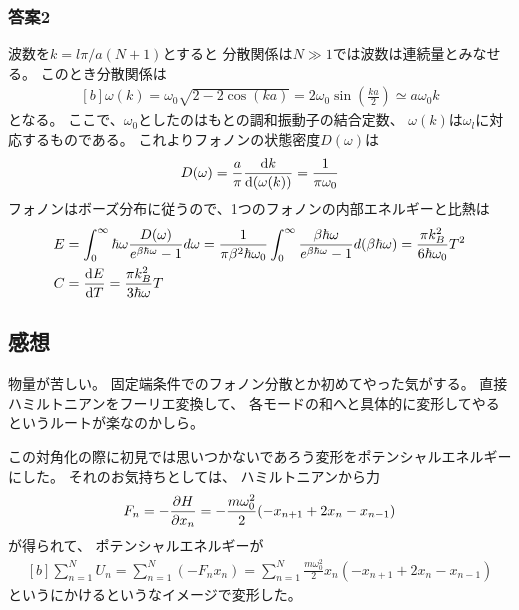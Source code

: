 \documentclass[../../sp_2015.tex]{subfiles}
\begin{document}
\subsubsection{答案2}
波数を\(k=l\pi/a(N+1)\)とすると
分散関係は\(N\gg1\)では波数は連続量とみなせる。
このとき分散関係は
\begin{equation}\begin{aligned}[b]
    \omega(k) = \omega_0\sqrt{2-2\cos(ka)}=2\omega_0\sin(\frac{ka}{2})\simeq a\omega_0 k
\end{aligned}\end{equation}
となる。
ここで、\(\omega_0\)としたのはもとの調和振動子の結合定数、
\(\omega(k)\)は\(\omega_l\)に対応するものである。
これよりフォノンの状態密度\(D(\omega)\)は
\begin{equation}\begin{aligned}[b]
    D(\omega) = \frac{a}{\pi}\dv{k}{(\omega(k))} = \frac{1}{\pi\omega_0}
\end{aligned}\end{equation}
フォノンはボーズ分布に従うので、1つのフォノンの内部エネルギーと比熱は
\begin{equation}\begin{aligned}[b]
    E &= \int_0^\infty \hbar\omega \frac{D(\omega)}{e^{\beta\hbar\omega}-1}d\omega
    = \frac{1}{\pi\beta^2\hbar\omega_0}\int_{0}^{\infty}\frac{\beta\hbar\omega}{e^{\beta\hbar\omega}-1}d(\beta\hbar\omega)
    = \frac{\pi k_B^2}{6\hbar\omega_0}T^2\\
    C &= \dv{E}{T}= \frac{\pi k_B^2}{3\hbar\omega}T
\end{aligned}\end{equation}



\subsection*{感想}
物量が苦しい。
固定端条件でのフォノン分散とか初めてやった気がする。
直接ハミルトニアンをフーリエ変換して、
各モードの和へと具体的に変形してやるというルートが楽なのかしら。

この対角化の際に初見では思いつかないであろう変形をポテンシャルエネルギーにした。
それのお気持ちとしては、
ハミルトニアンから力
\begin{equation*}\begin{aligned}[b]
    F_n=-\pdv{H}{x_n}=-\frac{m\omega_0^2}{2}(-x_{n+1}+2x_n-x_{n-1})
\end{aligned}\end{equation*}
が得られて、
ポテンシャルエネルギーが
\begin{equation*}\begin{aligned}[b]
    \sum_{n=1}^{N}U_n = \sum_{n=1}^{N}(-F_n x_n) = \sum_{n=1}^{N}\frac{m\omega_0^2}{2}x_n(-x_{n+1}+2x_n-x_{n-1})
\end{aligned}\end{equation*}
というにかけるというなイメージで変形した。
\end{document}
